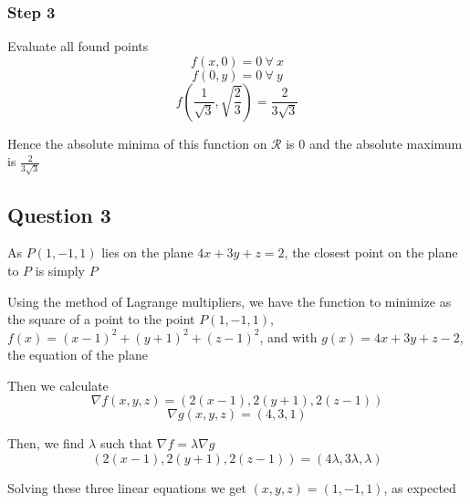 \documentclass{article}
\begin{document}
\subsubsection*{Step 3}
Evaluate all found points
\[
f(x,0) = 0 \ \forall \ x
\]
\[
f(0,y) =0 \ \forall \ y
\]
\[
f\left(\frac{1}{\sqrt{3}}, \sqrt{\frac{2}{3}}\right) = \frac{2}{3\sqrt{3}}
\]

Hence the absolute minima of this function on \(\mathcal{R}\) is 0 and the absolute maximum is \( \frac{2}{3\sqrt{3}}\)
\subsection*{Question 3}
As \(P(1,-1,1)\) lies on the plane \(4x + 3y +z =2\), the closest point on the plane to \(P\) is simply \(P\)

Using the method of Lagrange multipliers, we have the function to minimize as the square of a point to the point \(P(1,-1,1)\), 
\(f(x) = (x-1)^2 + (y+1)^2 + (z-1)^2\), and with \(g(x) = 4x + 3y +z -2\), the equation of the plane

Then we calculate 
\[
\nabla f(x,y,z) = (2(x-1), 2(y+1), 2(z-1))
\]
\[
\nabla g(x,y,z) = (4,3,1)
\]

Then, we find \(\lambda\) such that \(\nabla f = \lambda \nabla g\)
\[
(2(x-1), 2(y+1), 2(z-1)) = (4\lambda, 3\lambda, \lambda)
\]

Solving these three linear equations we get \((x,y,z) = (1,-1,1)\), as expected
\end{document}
